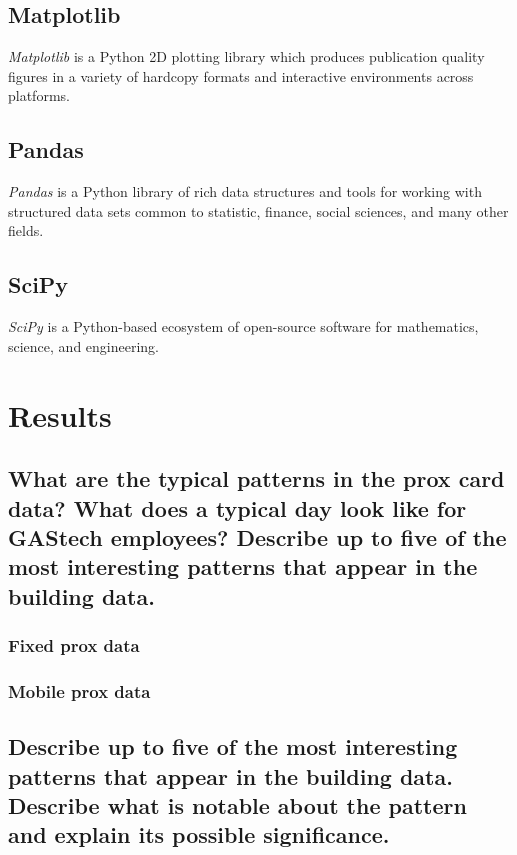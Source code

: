 \documentclass[aps, 10pt, a4paper]{article}
\begin{document}
        \subsection{Matplotlib}
            \textit{Matplotlib} is a Python 2D plotting library which produces publication quality figures in a variety of hardcopy formats and interactive environments across platforms. \cite{ref:matplotlib1}
            
        \subsection{Pandas}
            \textit{Pandas} is a Python library of rich data structures and tools for working with structured data sets common to statistic, finance, social sciences, and many other fields. \cite{ref:pandas1}
            
        \subsection{SciPy}
            \textit{SciPy} is a Python-based ecosystem of open-source software for mathematics, science, and engineering. 
    
    \section{Results}
        \subsection[Question 1]{What are the typical patterns in the prox card data? What does a typical day look like for GAStech employees? Describe up to five of the most interesting patterns that appear in the building data.}
            \subsubsection{Fixed prox data}
            
            \subsubsection{Mobile prox data}
        
        \subsection[Question 2]{Describe up to five of the most interesting patterns that appear in the building data. Describe what is notable about the pattern and explain its possible significance.}
        
\end{document}

